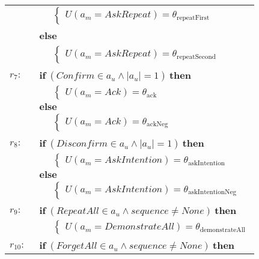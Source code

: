 \begin{footnotesize}
\begin{longtable}{p{1cm}l}
& $\;\;\;\;\; \begin{cases}U(\mathit{a_m}\!=\!\mathit{AskRepeat})\!=\!\theta_{\mathrm{repeatFirst}}\end{cases}$ \\ & \textbf{else} \\
& $\;\;\;\;\; \begin{cases}U(\mathit{a_m}\!=\!\mathit{AskRepeat})\!=\!\theta_{\mathrm{repeatSecond}}\end{cases}$ \\ \\[-2mm]
$r_{7}: \ \ $& $\textbf{if} \ (\mathit{Confirm}\!\in\!\mathit{a_u} \land \mathit{|a_u|}\!=\!\mathit{1}) \ \textbf{then}$ \\
& $\;\;\;\;\; \begin{cases}U(\mathit{a_m}\!=\!\mathit{Ack})\!=\!\theta_{\mathrm{ack}}\end{cases}$ \\ 
& $\textbf{else}$ \\
& $\;\;\;\;\; \begin{cases}U(\mathit{a_m}\!=\!\mathit{Ack})\!=\!\theta_{\mathrm{ackNeg}}\end{cases}$ \\ \\[-2mm]
$r_{8}: \ \ $& $\textbf{if} \ (\mathit{Disconfirm}\!\in\!\mathit{a_u} \land \mathit{|a_u|}\!=\!\mathit{1}) \ \textbf{then}$ \\
& $\;\;\;\;\; \begin{cases}U(\mathit{a_m}\!=\!\mathit{AskIntention})\!=\!\theta_{\mathrm{askIntention}}\end{cases}$ \\ 
& $\textbf{else}$ \\
& $\;\;\;\;\; \begin{cases}U(\mathit{a_m}\!=\!\mathit{AskIntention})\!=\!\theta_{\mathrm{askIntentionNeg}}\end{cases}$\\ \\[-2mm]
$r_{9}: \ \ $& $\textbf{if} \ (\mathit{RepeatAll}\!\in\!\mathit{a_u} \land \mathit{sequence}\!\neq\!\mathit{None}) \ \textbf{then}$ \\
& $\;\;\;\;\; \begin{cases}U(\mathit{a_m}\!=\!\mathit{DemonstrateAll})\!=\!\theta_{\mathrm{demonstrateAll}}\end{cases}$\\ \\[-2mm]
$r_{10}: \ \ $& $\textbf{if} \ (\mathit{ForgetAll}\!\in\!\mathit{a_u} \land \mathit{sequence}\!\neq\!\mathit{None}) \ \textbf{then}$ \\

\end{longtable}
\end{footnotesize}

